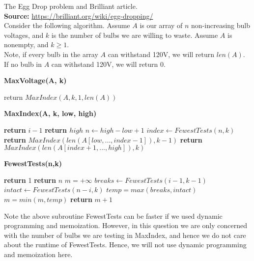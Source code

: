 \documentclass[12pt]{article}
\begin{document}
The Egg Drop problem and Brilliant article. \\

\textbf{Source:} \url{https://brilliant.org/wiki/egg-dropping/} \\

Consider the following algorithm. Assume $A$ is our array of $n$ non-increasing bulb voltages, and $k$ is the number of bulbs we are willing to waste. Assume $A$ is nonempty, and $k \geq 1$. \\

Note, if every bulb in the array $A$ can withstand 120V, we will return $len(A)$. If no bulb in $A$ can withstand 120V, we will return 0. 

\begin{algorithm}[hbt!]
\caption{\textbf{MaxVoltage(A, k)}}\label{alg:cap}

\begin{algorithmic}[1]
\State return $MaxIndex(A,k,1,len(A))$ 
\end{algorithmic}
\end{algorithm}

\begin{algorithm}[hbt!]
\caption{\textbf{MaxIndex(A, k, low, high)}}\label{alg:cap}

\begin{algorithmic}[1]
 
            \State \textbf{return} $i - 1$ 
        \EndIf
    \EndFor
    \State \textbf{return $high$} 
\EndIf
\State
\State $n \gets high - low + 1$
\State $index \gets FewestTests(n,k)$ 
    \State \textbf{return} $MaxIndex(len(A[low,...,index-1]), k-1)$   
\Else
    \State \textbf{return} $MaxIndex(len(A[index+1,...,high]), k)$  
\EndIf
\end{algorithmic}
\end{algorithm}
\newpage

\begin{algorithm}[hbt!]
\caption{\textbf{FewestTests(n,k)} }\label{alg:cap}

\begin{algorithmic}[1]
 
    \State \textbf{return} 1 
\EndIf
{} 
    \State \textbf{return} $n$ 
\EndIf
\State
\State $m = + \infty$
    \State $breaks \gets FewestTests(i-1, k-1)$ 
    \State $intact \gets FewestTests(n-i, k)$
    \State $temp = max(breaks, intact)$
    \State $m = min(m, temp)$ 
\EndFor
\State \textbf{return} $m+1$
\end{algorithmic}
\end{algorithm}
Note the above subroutine FewestTests can be faster if we used dynamic programming and memoization. However, in this question we are only concerned with the number of bulbs we are testing in MaxIndex, and hence we do not care about the runtime of FewestTests. Hence, we will not use dynamic programming and memoization here. 
\end{document}
